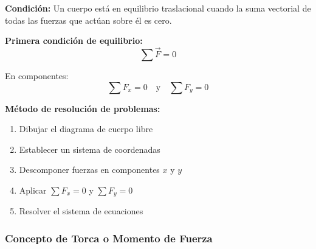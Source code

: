 \begin{seccion}
\textbf{Condición:} Un cuerpo está en equilibrio traslacional cuando la suma vectorial de todas las fuerzas que actúan sobre él es cero.

\begin{ecuacion}
\textbf{Primera condición de equilibrio:}
$$\sum \vec{F} = 0$$

En componentes:
$$\sum F_x = 0 \quad \text{y} \quad \sum F_y = 0$$
\end{ecuacion}


\textbf{Método de resolución de problemas:}
\begin{enumerate}
    \item Dibujar el diagrama de cuerpo libre
    \item Establecer un sistema de coordenadas
    \item Descomponer fuerzas en componentes $x$ y $y$
    \item Aplicar $\sum F_x = 0$ y $\sum F_y = 0$
    \item Resolver el sistema de ecuaciones
\end{enumerate}
\end{seccion}

\subsubsection{Concepto de Torca o Momento de Fuerza}

